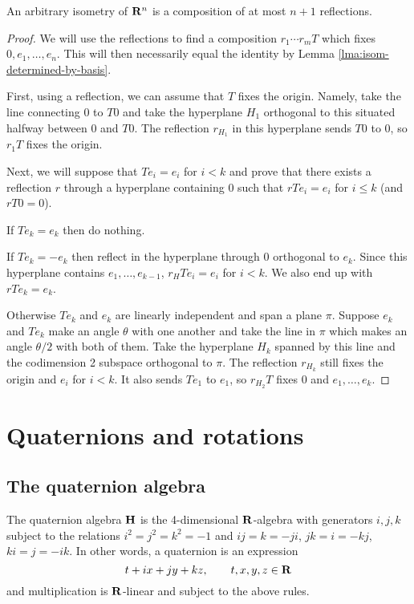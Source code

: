 \documentclass[12pt]{article}
\begin{document}
\begin{thm}
  An arbitrary isometry of $\mathbf{R}^n$ is a composition of at most $n+1$ reflections.
\end{thm}
\begin{proof}
  We will use the reflections to find a composition $r_1\cdots r_mT$ which fixes $0,e_1,\ldots,e_n$. This will then necessarily equal the identity by Lemma \ref{lma:isom-determined-by-basis}.

  First, using a reflection, we can assume that $T$ fixes the origin. Namely, take the line connecting $0$ to $T0$ and take the hyperplane $H_1$ orthogonal to this situated halfway between $0$ and $T0$. The reflection $r_{H_1}$ in this hyperplane sends $T0$ to $0$, so $r_1T$ fixes the origin.

  Next, we will suppose that $Te_i=e_i$ for $i<k$ and prove that there exists a reflection $r$ through a hyperplane containing $0$ such that $rTe_i=e_i$ for $i\leq k$ (and $rT0=0$).

  If $Te_k=e_k$ then do nothing.

  If $Te_k=-e_k$ then reflect in the hyperplane through 0 orthogonal to $e_k$. Since this hyperplane contains $e_1,\ldots,e_{k-1}$, $r_HTe_i=e_i$ for $i<k$. We also end up with $rTe_k=e_k$.
  
  Otherwise $Te_k$ and $e_k$ are linearly independent and span a plane $\pi$. Suppose $e_k$ and $Te_k$ make an angle $\theta$ with one another and take the line in $\pi$ which makes an angle $\theta/2$ with both of them. Take the hyperplane $H_k$ spanned by this line and the codimension 2 subspace orthogonal to $\pi$. The reflection $r_{H_k}$ still fixes the origin and $e_i$ for $i<k$. It also sends $Te_1$ to $e_1$, so $r_{H_2}T$ fixes $0$ and $e_1,\ldots,e_k$.
\end{proof}

\newpage

\section{Quaternions and rotations}

\subsection{The quaternion algebra}

\begin{dfn}
  The quaternion algebra $\mathbf{H}$ is the 4-dimensional $\mathbf{R}$-algebra with generators $i,j,k$ subject to the relations $i^2=j^2=k^2=-1$ and $ij=k=-ji$, $jk=i=-kj$, $ki=j=-ik$. In other words, a quaternion is an expression
  \[t+ix+jy+kz,\qquad t,x,y,z\in\mathbf{R}\]
  and multiplication is $\mathbf{R}$-linear and subject to the above rules.
\end{dfn}
\end{document}

